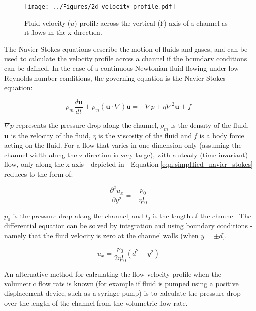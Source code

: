 \begin{figure}
	\centering
	\texttt{[image: ../Figures/2d\_velocity\_profile.pdf]}
	\caption[Fluid velocity profile across a microchannel.]{Fluid velocity ($u$) profile across the vertical ($Y$) axis of a channel as it flows in the x-direction.}
	\label{fig:2d_velocity_profile}
\end{figure}

The Navier-Stokes equations describe the motion of fluids and gases, and can be used to calculate the velocity profile across a channel if the boundary conditions can be defined. In the case of a continuous Newtonian fluid flowing under low Reynolds number conditions, the governing equation is the Navier-Stokes equation:

\begin{equation}
 \rho_{m} \frac {d\textbf{u}}{dt} + \rho_{m} (\textbf{u} \cdot \nabla)\textbf{u} = -\nabla p + \eta \nabla^{2} \textbf{u} + f
\label{eqn:simplified_navier_stokes}
\end{equation}


$\nabla p$ represents the pressure drop along the channel, $\rho_{m}$ is the density of the fluid, $\textbf{u}$ is the velocity of the fluid, $\eta$ is the viscosity of the fluid and $f$ is a body force acting on the fluid. For a flow that varies in one dimension only (assuming the channel width along the z-direction is very large), with a steady (time invariant) flow, only along the x-axis - depicted in  - Equation \ref{eqn:simplified_navier_stokes} reduces to the form of:

\begin{equation}
 \frac{\partial^{2}u_{x}}{\partial y^{2}} = - \frac {p_{0}} {\eta l_{0}}
\label{eqn:1d_steady_state_navier_stokes}
\end{equation}

$p_{0}$ is the pressure drop along the channel, and $l_{0}$ is the length of the channel. The differential equation can be solved by integration and using boundary conditions - namely that the fluid velocity is zero at the channel walls (when $y=\pm d$).

\begin{equation}
 u_{x} = \frac {p_{0}} {2\eta l_{0}} (d^{2} - y^{2})
\label{2d_steady_state_solution_navier_stokes}
\end{equation}

An alternative method for calculating the flow velocity profile when the volumetric flow rate is known (for example if fluid is pumped using a positive displacement device, such as a syringe pump) is to calculate the pressure drop over the length of the channel from the volumetric flow rate.

